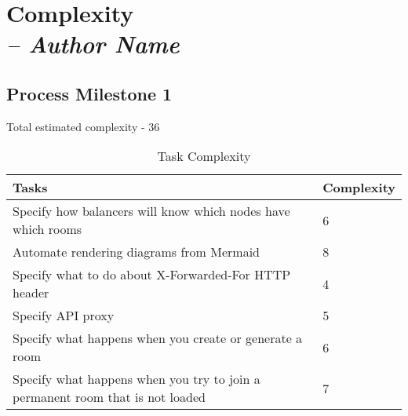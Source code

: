 \chapter{Complexity \\
  \small{\textit{-- Author Name}}
  \label{Chapter::complexity}}

  \section*{Process Milestone 1}

  Total estimated complexity - 36

  \begin{table}[htbp]
    \centering
    \caption{Task Complexity}
      \begin{tabular}{ll}
      \toprule
      Tasks & Complexity \\
      \midrule
      Specify how balancers will know which nodes have which rooms & 6 \\
      Automate rendering diagrams from Mermaid & 8 \\
      Specify what to do about X-Forwarded-For HTTP header & 4 \\
      Specify API proxy & 5 \\
      Specify what happens when you create or generate a room & 6 \\
      Specify what happens when you try to join a permanent room that is not loaded & 7 \\
      \bottomrule
      \end{tabular}%
    \label{tab:complexity}%
  \end{table}%